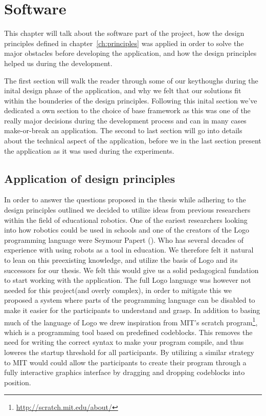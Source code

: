 \chapter{Software}\label{ch:software}
This chapter will talk about the software part of the project, how the design principles defined in chapter~\ref{ch:principles} was applied in order to solve the major obstacles before developing the application, and how the design principles helped us during the development. 

\bigskip\noindent
The first section will walk the reader through some of our keythoughs during the inital design phase of the application, and why we felt that our solutions fit within the bounderies of the design principles. 
Following this inital section we've dedicated a own section to the choice of base framework as this was one of the really major decisions during the development process and can in many cases make-or-break an application.
The second to last section will go into details about the technical aspect of the application, before we in the last section present the application as it was used during the experiments.

\section{Application of design principles}
In order to answer the questions proposed in the thesis while adhering to the design principles outlined we decided to utilize ideas from previous researchers within the field of educational robotics. 
One of the eariest researchers looking into how robotics could be used in schools and one of the creators of the Logo programming language were Seymour Papert (\cite{papert1980mindstorms}). Who has several decades of experience with using robots as a tool in education.
We therefore felt it natural to lean on this preexisting knowledge, and utilize the basis of Logo and its successors for our thesis. We felt this would give us a solid pedagogical fundation to start working with the application.
The full Logo language was however not needed for this project(and overly complex), in order to mitigate this we proposed a system where parts of the programming language can be disabled to make it easier for the participants to understand and grasp. In addition to basing much of the language of Logo we drew inspiration from MIT's scratch program\footnote{\url{http://scratch.mit.edu/about/}}, which is a programming tool based on predefined codeblocks. This removes the need for writing the correct syntax to make your program compile, and thus loweres the startup threshold for all participants. By utilizing a similar strategy to MIT would could allow the participants to create their program through a fully interactive graphics interface by dragging and dropping codeblocks into position. 


